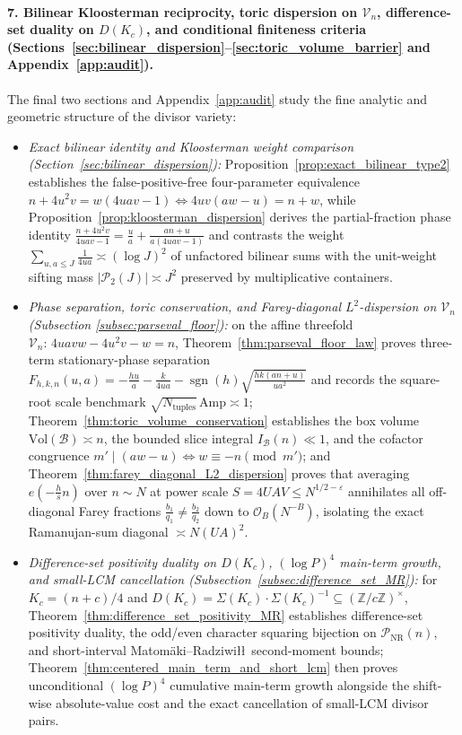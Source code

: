 \documentclass[11pt, a4paper]{article}
\theoremstyle{plain}
\theoremstyle{definition}
\newcommand{\Z}{\mathbb{Z}}
\begin{document}
\paragraph{7. Bilinear Kloosterman reciprocity, toric dispersion on $\mathcal{V}_n$, difference-set duality on $D(K_c)$, and conditional finiteness criteria (Sections~\ref{sec:bilinear_dispersion}--\ref{sec:toric_volume_barrier} and Appendix~\ref{app:audit}).}
The final two sections and Appendix~\ref{app:audit} study the fine analytic and geometric structure of the divisor variety:
\begin{itemize}
    \item \emph{Exact bilinear identity and Kloosterman weight comparison (Section~\ref{sec:bilinear_dispersion}):} Proposition~\ref{prop:exact_bilinear_type2} establishes the false-positive-free four-parameter equivalence $n+4u^{2}v=w(4uav-1)\iff 4uv(aw-u)=n+w$, while Proposition~\ref{prop:kloosterman_dispersion} derives the partial-fraction phase identity $\frac{n+4u^2v}{4uav-1}=\frac{u}{a}+\frac{an+u}{a(4uav-1)}$ and contrasts the weight $\sum_{u,a\le J}\frac{1}{4ua}\asymp(\log J)^{2}$ of unfactored bilinear sums with the unit-weight sifting mass $|\mathcal{P}_2(J)|\asymp J^{2}$ preserved by multiplicative containers.
    \item \emph{Phase separation, toric conservation, and Farey-diagonal $L^{2}$-dis\-per\-sion on $\mathcal{V}_n$ (Sub\-sec\-tion \ref{subsec:parseval_floor}):} on the affine threefold $\mathcal{V}_n:\,4uavw-4u^{2}v-w=n$, Theorem~\ref{thm:parseval_floor_law} proves three-term stationary-phase separation $F_{h,k,n}(u,a)=-\frac{hu}{a}-\frac{k}{4ua}-\operatorname{sgn}(h)\sqrt{\frac{hk(an+u)}{ua^{2}}}$ and records the square-root scale benchmark $\sqrt{N_{\mathrm{tuples}}}\,\mathrm{Amp}\asymp 1$; Theorem~\ref{thm:toric_volume_conservation} establishes the box volume $\mathrm{Vol}(\mathcal{B})\asymp n$, the bounded slice integral $I_{\mathcal{B}}(n)\ll 1$, and the cofactor congruence $m'\mid(aw-u)\iff w\equiv-n\pmod{m'}$; and Theorem~\ref{thm:farey_diagonal_L2_dispersion} proves that averaging $e(-\frac{h}{s}n)$ over $n\sim N$ at power scale $S=4UAV\le N^{1/2-\varepsilon}$ annihilates all off-diagonal Farey fractions $\frac{b_1}{q_1}\neq\frac{b_2}{q_2}$ down to $\mathcal{O}_B(N^{-B})$, isolating the exact Ramanujan-sum diagonal $\asymp N(UA)^{2}$.
    \item \emph{Difference-set positivity duality on $D(K_c)$, $(\log P)^{4}$ main-term growth, and small-LCM cancellation (Subsection~\ref{subsec:difference_set_MR}):} for $K_c=(n+c)/4$ and $D(K_c)=\Sigma(K_c)\cdot\Sigma(K_c)^{-1}\subseteq(\Z/c\Z)^{\times}$, Theorem~\ref{thm:difference_set_positivity_MR} establishes difference-set positivity duality, the odd/even character squaring bijection on $\mathcal{P}_{\mathrm{NR}}(n)$, and short-interval Matom\"{a}ki--Radziwi\l\l\ second-moment bounds; Theorem~\ref{thm:centered_main_term_and_short_lcm} then proves unconditional $(\log P)^{4}$ cumulative main-term growth alongside the shift-wise absolute-value cost and the exact cancellation of small-LCM divisor pairs.

\end{itemize}
\end{document}
